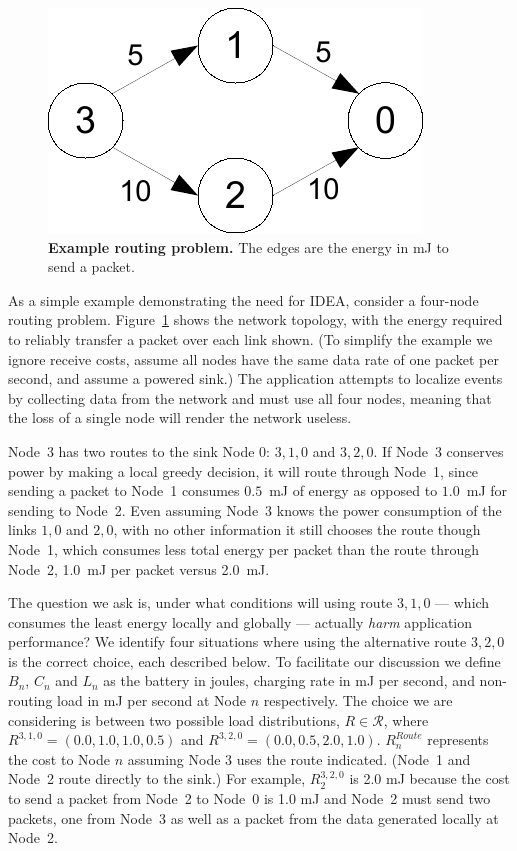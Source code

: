 \begin{figure}[t]
\begin{center}
\includegraphics[width=0.6\hsize]{./5-idea/figs/motivationexample.pdf}
\end{center}
\caption{\textbf{Example routing problem.} The edges are the energy in mJ to
send a packet.}
\label{idea-fig-motivationexample}
\end{figure}

As a simple example demonstrating the need for IDEA, consider a four-node
routing problem. Figure~\ref{idea-fig-motivationexample} shows the network
topology, with the energy required to reliably transfer a packet over each
link shown. (To simplify the example we ignore receive costs, assume all
nodes have the same data rate of one packet per second, and assume a powered
sink.) The application attempts to localize events by collecting data from
the network and must use all four nodes, meaning that the loss of a single
node will render the network useless.

Node~3 has two routes to the sink Node 0: $3,1,0$ and $3,2,0$. If Node~3
conserves power by making a local greedy decision, it will route through
Node~1, since sending a packet to Node~1 consumes $0.5$~mJ of energy as
opposed to $1.0$~mJ for sending to Node~2. Even assuming Node~3 knows the
power consumption of the links $1,0$ and $2,0$, with no other information it
still chooses the route though Node~1, which consumes less total energy per
packet than the route through Node~2, 1.0~mJ per packet versus 2.0~mJ.

The question we ask is, under what conditions will using route $3,1,0$ ---
which consumes the least energy locally and globally --- actually
\textit{harm} application performance?  We identify four situations where
using the alternative route $3,2,0$ is the correct choice, each described
below. To facilitate our discussion we define $B_n$, $C_n$ and $L_n$ as the
battery in joules, charging rate in mJ per second, and non-routing load in mJ
per second at Node $n$ respectively. The choice we are considering is between
two possible load distributions, $R \in \mathcal{R}$, where $R^{3,1,0} =
(0.0, 1.0, 1.0, 0.5)$ and $R^{3,2,0} = (0.0, 0.5, 2.0, 1.0)$. $R^{Route}_n$
represents the cost to Node $n$ assuming Node 3 uses the route indicated.
(Node~1 and Node~2 route directly to the sink.)  For example, $R^{3,2,0}_2$
is 2.0 mJ because the cost to send a packet from Node~2 to Node~0 is 1.0 mJ
and Node~2 must send two packets, one from Node~3 as well as a packet from
the data generated locally at Node~2.

